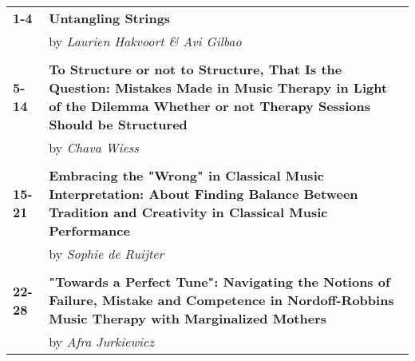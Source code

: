 \documentclass{article}
\begin{document}
\begin{tcolorbox}[colback=background, colframe=background, sharp corners, boxrule=0pt, width=\textwidth, height=\textheight, valign=center, nobeforeafter, title={\vspace*{-\baselineskip}\Huge \color{black}\textbf{Contents}},
  ]


  \vspace{2cm}

  \begin{flushleft}
    \noindent\begin{tabularx}{\textwidth}{p{} >{\RaggedLeft\arraybackslash\large}X}
      \textbf{1-4}   & \textbf{Untangling Strings}                                                                                                                                                  \\
                     & by \textit{Laurien Hakvoort \& Avi Gilbao}                                                                                                                                   \\
      \\
      \textbf{5-14}  & \textbf{To Structure or not to Structure, That Is the Question: Mistakes Made in Music Therapy in Light of the Dilemma Whether or not Therapy Sessions Should be Structured} \\
                     & by \textit{Chava Wiess}                                                                                                                                                      \\
      \\
      \textbf{15-21} & \textbf{Embracing the "Wrong" in Classical Music Interpretation: About Finding Balance Between Tradition and Creativity in Classical Music Performance}                      \\
                     & by \textit{Sophie de Ruijter}                                                                                                                                                \\
      \\
      \textbf{22-28} & \textbf{"Towards a Perfect Tune": Navigating the Notions of Failure, Mistake and Competence in Nordoff-Robbins Music Therapy with Marginalized Mothers}                      \\
                     & by \textit{Afra Jurkiewicz}                                                                                                                                                  \\

\end{tabularx}
\end{flushleft}
\end{tcolorbox}
\end{document}
